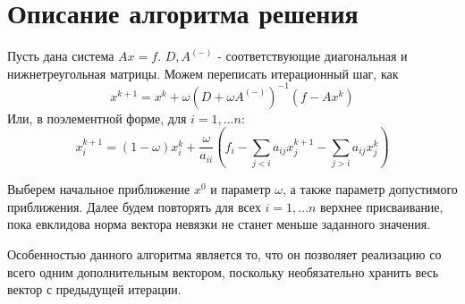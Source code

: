 \newpage
\section{Описание алгоритма решения}

Пусть дана система $Ax = f$.
$D, A^{(-)}$ - соответствующие диагональная и нижнетреугольная матрицы.
Можем переписать итерационный шаг, как
$$
    x^{k + 1} = x^k + \omega\left(D + \omega A^{(-)}\right)^{-1} \left(f - Ax^k\right)
$$
Или, в поэлементной форме, для $i = 1, \ldots n$:
$$
    x_i^{k + 1} = (1 - \omega)x_i^k + \frac{\omega}{a_{ii}} \left(f_i - \sum_{j < i} a_{ij}x_j^{k + 1} - \sum_{j > i} a_{ij}x_j^k\right)
$$

Выберем начальное приближение $x^0$ и параметр $\omega$, а также параметр допустимого приближения.
Далее будем повторять для всех $i = 1, \ldots n$ верхнее присваивание, пока евклидова норма вектора невязки не станет меньше заданного значения.

Особенностью данного алгоритма является то, что он позволяет реализацию со всего одним дополнительным вектором,
поскольку необязательно хранить весь вектор с предыдущей итерации.
